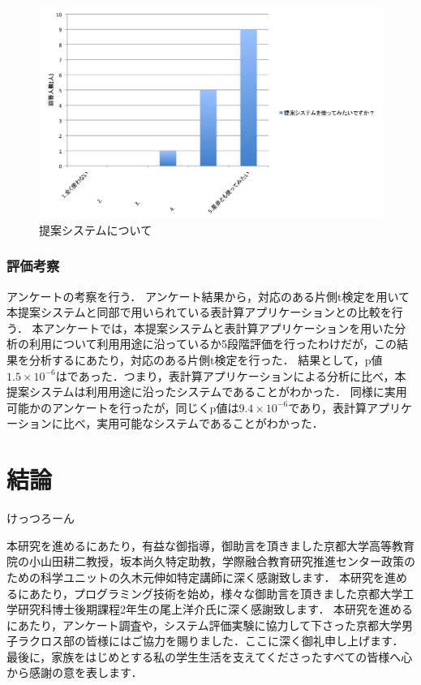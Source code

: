 \documentclass[sotsuron]{kuee}
\begin{document}
			\begin{figure}
				\begin{center}
					\includegraphics[width=\linewidth]{./png/result08.png}
				\end{center}
				\caption{提案システムについて}
		  		\label{fig:result08}
			\end{figure}
		\subsection{評価考察}
			アンケートの考察を行う．
			アンケート結果から，対応のある片側t検定を用いて本提案システムと同部で用いられている表計算アプリケーションとの比較を行う．
			本アンケートでは，本提案システムと表計算アプリケーションを用いた分析の利用について利用用途に沿っているか5段階評価を行ったわけだが，この結果を分析するにあたり，対応のある片側t検定を行った．
			結果として，p値$1.5 \times 10^{-6}$はであった．つまり，表計算アプリケーションによる分析に比べ，本提案システムは利用用途に沿ったシステムであることがわかった．
			同様に実用可能かのアンケートを行ったが，同じくp値は$9.4 \times 10^{-6}$であり，表計算アプリケーションに比べ，実用可能なシステムであることがわかった．

\chapter{結論}
けっつろーん


\begin{acknowledgements}
	本研究を進めるにあたり，有益な御指導，御助言を頂きました京都大学高等教育院の小山田耕二教授，坂本尚久特定助教，学際融合教育研究推進センター政策のための科学ユニットの久木元伸如特定講師に深く感謝致します．
	本研究を進めるにあたり，プログラミング技術を始め，様々な御助言を頂きました京都大学工学研究科博士後期課程2年生の尾上洋介氏に深く感謝致します．
	本研究を進めるにあたり，アンケート調査や，システム評価実験に協力して下さった京都大学男子ラクロス部の皆様にはご協力を賜りました．ここに深く御礼申し上げます．
	最後に，家族をはじめとする私の学生生活を支えてくださったすべての皆様へ心から感謝の意を表します．
\end{acknowledgements}
\end{document}
